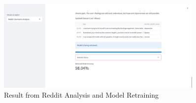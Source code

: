 \pagebreak

\begin{figure}[h!]  
    \centering
    \includegraphics[width=0.9\textwidth]{App Images/17 Interface.png}  
    \caption{Result from Reddit Analysis and Model Retraining}
    \label{10i}  %
\end{figure}


